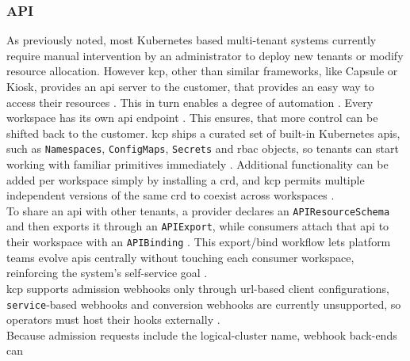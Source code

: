 \documentclass[11pt, a4paper, oneside, listof=totoc]{scrartcl}
\begin{document}
            \subsubsection{API}\label{subsubsec:api}
                As previously noted, most Kubernetes based multi-tenant systems currently require
                manual intervention by an administrator to deploy new tenants or modify resource
                allocation.
                However \gls{kcp}, other than similar frameworks, like Capsule or Kiosk, provides an
                \gls{api} server to the customer, that provides an easy way to access
                their resources \parencites[p.~651]{nguyen2022}{kcpio}.
                This in turn enables a degree of automation \parencite[p.~651]{nguyen2022}.
                Every workspace has its own \gls{api} endpoint \parencite{kcpWorkspaces}.
                This ensures, that more control can be shifted back to the customer.
                \gls{kcp} ships a curated set of built-in Kubernetes \glspl{api}, such as
                \texttt{Namespaces}, \texttt{ConfigMaps}, \texttt{Secrets} and \gls{rbac} objects, 
                so tenants can start working with familiar primitives immediately
                \parencite{kcpAPIsBuiltIn}.
                Additional functionality can be added per workspace simply by installing a
                \gls{crd}, and \gls{kcp} permits multiple independent versions of the same \gls{crd}
                to coexist across workspaces \parencite{kcpAPIs}.
                \\
                To share an \gls{api} with other tenants, a provider declares an
                \texttt{APIResourceSchema} and then exports it through an \texttt{APIExport},
                while consumers attach that \gls{api} to their workspace with an \texttt{APIBinding}
                \parencite{kcpAPIsExport}.
                This export/bind workflow lets platform teams evolve \glspl{api} centrally without
                touching each consumer workspace, reinforcing the system's self-service goal
                \parencite{kcpAPIsExport}.
                \\
                \gls{kcp} supports admission webhooks only through \gls{url}-based client
                configurations, \texttt{service}-based webhooks and conversion webhooks are
                currently unsupported, so operators must host their hooks externally
                \parencite{kcpAPIsAdmissionWebhooks}.
                \\
                Because admission requests include the logical-cluster name, webhook back-ends can
\end{document}
